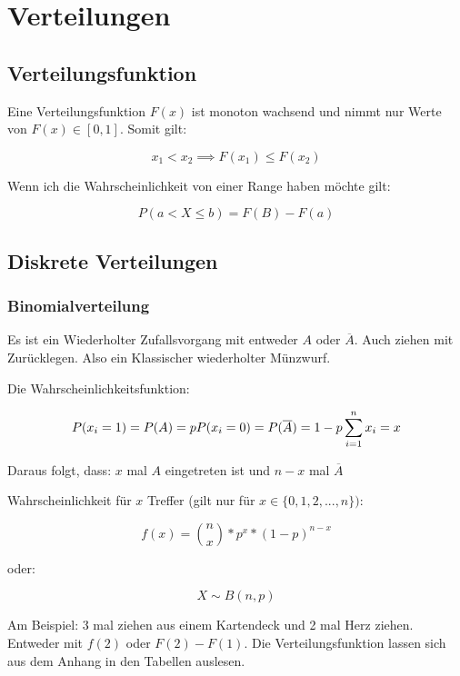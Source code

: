 \documentclass[a4paper]{article}
\title{\docTitle}
\author{Moritz}
\date{\today}
\begin{document}
\maketitle
\tableofcontents


\section{Verteilungen}

\subsection{Verteilungsfunktion}

Eine Verteilungsfunktion $F(x)$ ist monoton wachsend und nimmt nur Werte von $F(x) \in [0, 1]$. Somit gilt:

\[
x_1 < x_2 \implies F(x_1) \leq F(x_2)
\]

Wenn ich die Wahrscheinlichkeit von einer Range haben möchte gilt:

\[
P(a < X \leq b) = F(B) - F(a)
\]

\subsection{Diskrete Verteilungen}

\subsubsection{Binomialverteilung}

Es ist ein Wiederholter Zufallsvorgang mit entweder $A$ oder $\overline{A}$. Auch ziehen mit Zurücklegen. Also ein Klassischer wiederholter Münzwurf.

Die Wahrscheinlichkeitsfunktion:

\[
P(x_i = 1) = P(A) = p \\
P(x_i = 0) = P(\overline{A}) = 1 - p\\
\sum_{i=1}^{n} x_i = x
\]

Daraus folgt, dass: $x$ mal $A$ eingetreten ist und $n-x$ mal $\overline{A}$

Wahrscheinlichkeit für $x$ Treffer (gilt nur für $x\in\{0, 1, 2, ..., n\})$:

\[
f(x) = \binom{n}{x} * p^x * (1-p)^{n-x}
\]

oder:

\[
X \sim B(n, p)
\]

Am Beispiel: 3 mal ziehen aus einem Kartendeck und 2 mal Herz ziehen. Entweder mit $f(2)$ oder $F(2) - F(1)$. Die Verteilungsfunktion lassen sich aus dem Anhang in den Tabellen auslesen.
\end{document}
